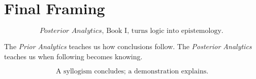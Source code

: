 \documentclass[12pt]{article}
\begin{document}
\section*{Final Framing}

\[
\boxed{
\textit{Posterior Analytics}, \text{ Book I, turns logic into epistemology.}
}
\]

The \textit{Prior Analytics} teaches us how conclusions follow. The
\textit{Posterior Analytics} teaches us when following becomes knowing.

\[
\boxed{
\text{A syllogism concludes; a demonstration explains.}
}
\]
\end{document}
